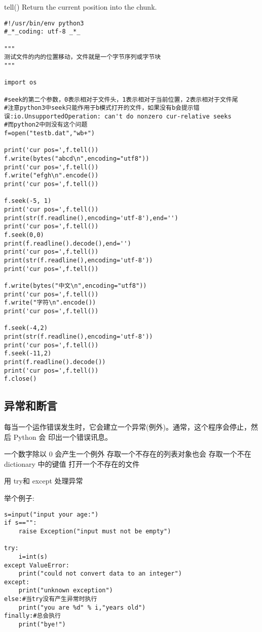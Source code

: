 \documentclass[twoside,11pt]{book}
\begin{document}
tell()
Return the current position into the chunk.

\begin{lstlisting}
#!/usr/bin/env python3
#_*_coding: utf-8 _*_

"""
测试文件的内的位置移动，文件就是一个字节序列或字节块
"""

import os

#seek的第二个参数，0表示相对于文件头，1表示相对于当前位置，2表示相对于文件尾
#注意python3中seek只能作用于b模式打开的文件，如果没有b会提示错误:io.UnsupportedOperation: can't do nonzero cur-relative seeks
#而python2中则没有这个问题
f=open("testb.dat","wb+")

print('cur pos=',f.tell())
f.write(bytes("abcd\n",encoding="utf8"))
print('cur pos=',f.tell())
f.write("efgh\n".encode())
print('cur pos=',f.tell())

f.seek(-5, 1)
print('cur pos=',f.tell())
print(str(f.readline(),encoding='utf-8'),end='')
print('cur pos=',f.tell())
f.seek(0,0)
print(f.readline().decode(),end='')
print('cur pos=',f.tell())
print(str(f.readline(),encoding='utf-8'))
print('cur pos=',f.tell())

f.write(bytes("中文\n",encoding="utf8"))
print('cur pos=',f.tell())
f.write("字符\n".encode())
print('cur pos=',f.tell())

f.seek(-4,2)
print(str(f.readline(),encoding='utf-8'))
print('cur pos=',f.tell())
f.seek(-11,2)
print(f.readline().decode())
print('cur pos=',f.tell())
f.close()
\end{lstlisting}



\subsection{异常和断言}\label{sec:io:exceptiona}
每当一个运作错误发生时，它会建立一个异常(例外)。通常，这个程序会停止，然后 Python 会
印出一个错误讯息。

一个数字除以 0 会产生一个例外
存取一个不存在的列表对象也会
存取一个不在 dictionary 中的键值
打开一个不存在的文件

用 try和 except 处理异常


举个例子:
\begin{lstlisting}
s=input("input your age:")
if s=="":
    raise Exception("input must not be empty")

try:
    i=int(s)
except ValueError:
    print("could not convert data to an integer")
except:
    print("unknown exception")
else:#当try没有产生异常时执行
    print("you are %d" % i,"years old")
finally:#总会执行
    print("bye!")
\end{lstlisting}
\end{document}
